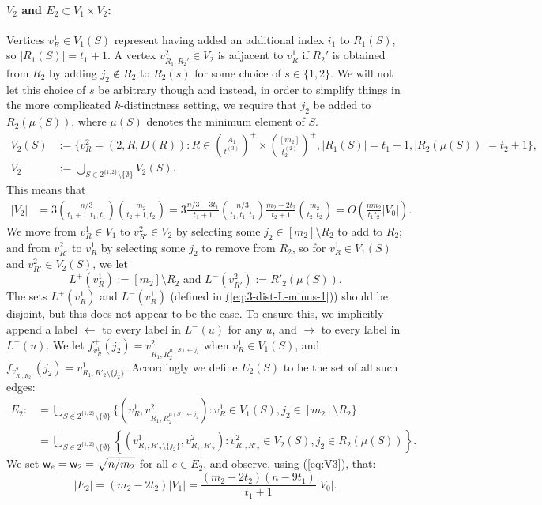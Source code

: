 \documentclass{theoretics}
\newcommand{\eq}[1]{\hyperref[eq:#1]{(\ref*{eq:#1})}}
\renewcommand{\>}{\rangle}
\newcommand{\<}{\langle}
\renewcommand{\(}{\left(}
\renewcommand{\)}{\right)}
\def\abs#1{\left| #1 \right|}
\def\w{{\sf w}}
\begin{document}
\paragraph{$V_2$ and ${E}_2\subset V_1\times V_2$:} Vertices $v_{R}^1\in V_1(S)$ represent having added an additional index $i_1$ to $R_1(S)$, so $|R_1(S)|=t_1+1$. A vertex $v_{R_1,R_2'}^2\in V_2$ is adjacent to $v_R^1$ if $R_2'$ is obtained from $R_2$ by adding $j_2\not\in R_2$ to $R_2(s)$ for some choice of $s\in\{1,2\}$.
We will not let this choice of $s$ be arbitrary though and instead, in order to simplify things in the more complicated $k$-distinctness setting, we require that 
$j_2$ be added to $R_2(\mu(S))$, where $\mu(S)$ denotes the minimum element of $S$. 
\begin{align*}
V_2(S) &:= \Bigg\{v^2_{R}=(2,R,D(R)):R\in\binom{A_1}{t_1^{(3)}}^+\times \binom{[m_2]}{t_2^{(2)}}^+ ,
\abs{R_1(S)} = t_1+1, \abs{R_2(\mu(S))} = t_2+1 \Bigg\},\\
V_2 &:=\bigcup_{S\in 2^{\{1,2\}}\setminus\{\emptyset\}}V_2(S). \label{eq:V-2-Ss}
\end{align*}
\noindent This means that
\begin{equation}
\begin{split}
|V_2|&=3\binom{n/3}{t_1+1,t_1,t_1}\binom{m_2}{t_2+1,t_2} = 3\frac{n/3-3t_1}{t_1+1}\binom{n/3}{t_1,t_1,t_1}\frac{m_2-2t_2}{t_2+1}\binom{m_2}{t_2,t_2}
 = O\left(\frac{nm_2}{t_1t_2}|V_0|\right).
\end{split}\label{eq:V4}
\end{equation}
We move from $v^1_R\in V_1$ to $v^2_{R'}\in V_2$ by selecting some $j_2\in [m_2]\setminus R_2$ to add to $R_2$; and from $v^2_{R'}$ to $v^1_R$ by selecting some $j_2$ to remove from $R_2$, so for $v^1_R\in V_1(S)$ and $v^2_{R'}\in V_2(S)$, we let
$$L^+(v^1_{R}):= [m_2]\setminus R_2 
\mbox{ and }
L^-(v^2_{R'}):=R'_2(\mu(S)).$$
The sets $L^+(v^1_R)$ and $L^-(v^1_R)$ (defined in \eq{3-dist-L-minus-1}) should be disjoint, but this does not appear to be the case. To ensure this, we implicitly append a label $\leftarrow$ to every label in $L^-(u)$ for any $u$, and $\rightarrow$ to every label in $L^+(u)$. 
We let $f^+_{v^1_{R}}(j_2) = v_{R_1,R_2^{\mu(S) \leftarrow j_2}}^2$ when $v_R^1\in V_1(S)$, and $f^-_{v^2_{R_1,R_2'}}(j_2) = v_{R_1,R'_2 \setminus \{j_2\}}^1$. Accordingly we define $E_2(S)$ to be the set of all such edges:
\begin{align*}
	E_2:&=\bigcup_{S\in 2^{\{1,2\}}\setminus\{\emptyset\}}\{(v^1_{R},v_{R_1,R_2^{\mu(S) \leftarrow j_2}}^2):v^1_{R}\in V_1(S), j_2 \in [m_2]\setminus R_2\} \\
	&=\bigcup_{S\in 2^{\{1,2\}}\setminus\{\emptyset\}}\left\{\left(v^1_{R_1,R'_2\setminus \{j_2\}},v_{R_1,R'_2}^2\right):v^2_{R_1,R'_2}\in V_2(S), j_2 \in R_2(\mu(S))\right\}.
\end{align*}
We set $\w_e = \w_2=\sqrt{n/m_2}$ for all $e \in E_2$, and observe, using \eq{V3}, that:
\begin{equation}
|E_2|=(m_2-2t_2)|V_1|=\frac{(m_2-2t_2)(n-9t_1)}{t_1+1}|V_0|. \label{eq:E3}
\end{equation}
\end{document}
